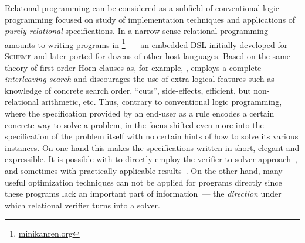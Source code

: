 Relatonal programming can be considered as a subfield of conventional logic programming focused on
study of implementation techniques and applications of \emph{purely relational} specifications. In a
narrow sense relational programming amounts to writing programs in \mk\footnote{\url{minikanren.org}}~--- an embedded DSL initially
developed for \textsc{Scheme} and later ported for dozens of other host languages. Based on the same
theory of first-order Horn clauses as, for example, \prolog, \mk employs a complete \emph{interleaving search}\cite{monad_transformers, our_paper_on_cemantics_APLAS} and
discourages the use of extra-logical features such as knowledge of concrete search order, ``cuts'', side-effects, efficient, but non-relational arithmetic, etc. Thus,
contrary to conventional logic programming, where the specification provided by an end-user as a rule encodes a
certain concrete way to solve a problem, in \mk the focus shifted even more into the specification of the
problem itself with no certain hints of how to solve its various instances. On one hand this makes the specifications
written in \mk short, elegant and expressible. It is possible with \mk to directly employ the verifier-to-solver
approach~\cite{type-inferencer,pattern-matching-APLAS}, and sometimes with practically applicable results~\cite{UI_generation_minikanren_2022,LOPSTR_2023}. On the other
hand, many useful optimization techniques can not be applied for \mk programs directly since these programs
lack an important part of information~--- the \emph{direction} under which relational verifier turns into a solver.

